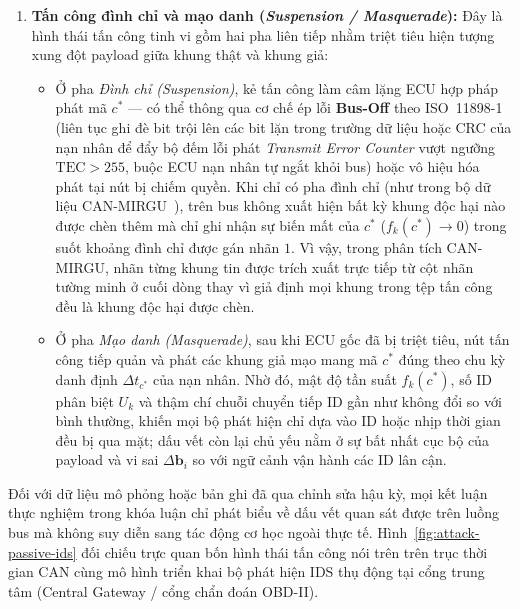 \documentclass[12pt, a4paper, reqno, oneside]{book}
\begin{document}
\begin{enumerate}
    \item \textbf{Tấn công đình chỉ và mạo danh (\textit{Suspension / Masquerade}):} Đây là hình thái tấn công tinh vi gồm hai pha liên tiếp nhằm triệt tiêu hiện tượng xung đột payload giữa khung thật và khung giả:
    \begin{itemize}
        \item Ở pha \textit{Đình chỉ (Suspension)}, kẻ tấn công làm câm lặng ECU hợp pháp phát mã $c^*$ — có thể thông qua cơ chế ép lỗi \textbf{Bus-Off} theo ISO~11898-1 (liên tục ghi đè bit trội lên các bit lặn trong trường dữ liệu hoặc CRC của nạn nhân để đẩy bộ đếm lỗi phát \textit{Transmit Error Counter} vượt ngưỡng $\text{TEC} > 255$, buộc ECU nạn nhân tự ngắt khỏi bus) hoặc vô hiệu hóa phát tại nút bị chiếm quyền. Khi chỉ có pha đình chỉ (như trong bộ dữ liệu CAN-MIRGU~\cite{rajapaksha2024canmirgu}), trên bus không xuất hiện bất kỳ khung độc hại nào được chèn thêm mà chỉ ghi nhận sự biến mất của $c^*$ ($f_k(c^*) \to 0$) trong suốt khoảng đình chỉ được gán nhãn $1$. Vì vậy, trong phân tích CAN-MIRGU, nhãn từng khung tin được trích xuất trực tiếp từ cột nhãn tường minh ở cuối dòng thay vì giả định mọi khung trong tệp tấn công đều là khung độc hại được chèn.
        \item Ở pha \textit{Mạo danh (Masquerade)}, sau khi ECU gốc đã bị triệt tiêu, nút tấn công tiếp quản và phát các khung giả mạo mang mã $c^*$ đúng theo chu kỳ danh định $\Delta t_{c^*}$ của nạn nhân. Nhờ đó, mật độ tần suất $f_k(c^*)$, số ID phân biệt $U_k$ và thậm chí chuỗi chuyển tiếp ID gần như không đổi so với bình thường, khiến mọi bộ phát hiện chỉ dựa vào ID hoặc nhịp thời gian đều bị qua mặt; dấu vết còn lại chủ yếu nằm ở sự bất nhất cục bộ của payload và vi sai $\Delta \mathbf{b}_i$ so với ngữ cảnh vận hành các ID lân cận.
    \end{itemize}
\end{enumerate}

Đối với dữ liệu mô phỏng hoặc bản ghi đã qua chỉnh sửa hậu kỳ, mọi kết luận thực nghiệm trong khóa luận chỉ phát biểu về dấu vết quan sát được trên luồng bus mà không suy diễn sang tác động cơ học ngoài thực tế. Hình~\ref{fig:attack-passive-ids} đối chiếu trực quan bốn hình thái tấn công nói trên trên trục thời gian CAN cùng mô hình triển khai bộ phát hiện IDS thụ động tại cổng trung tâm (Central Gateway / cổng chẩn đoán OBD-II).
\end{document}
